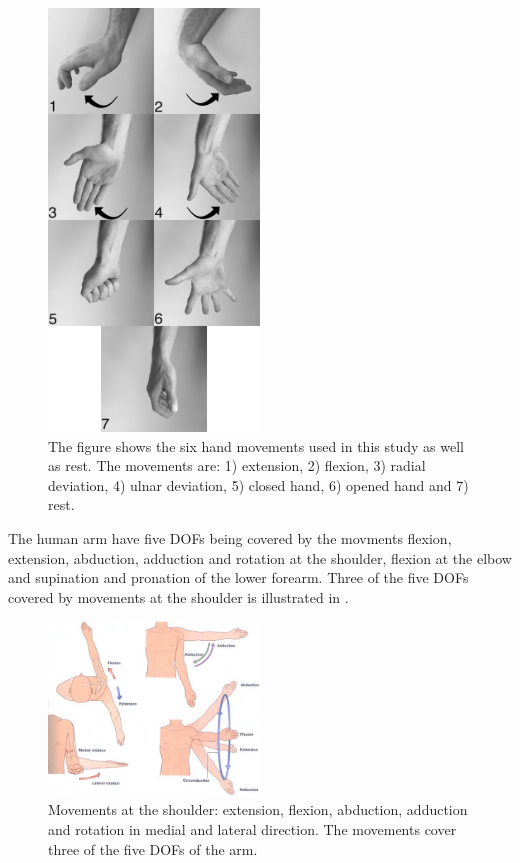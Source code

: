 \begin{figure}[H] 
	\includegraphics[width=0.5\textwidth]{figures/handGestures/BW/allHandMovementsVerticalBW}
	\caption{The figure shows the six hand movements used in this study as well as rest. The movements are: 1) extension, 2) flexion, 3) radial deviation, 4) ulnar deviation, 5) closed hand, 6) opened hand and 7) rest.}
	\label{fig:handMovements}
\end{figure}

The human arm have five DOFs being covered by the movments flexion, extension, abduction, adduction and rotation at the shoulder, flexion at the elbow and supination and pronation of the lower forearm. Three of the five DOFs covered by movements at the shoulder is illustrated in .

\begin{figure}[H] 
	\includegraphics[width=0.5\textwidth]{figures/xBackground/aAnatomy/armMovements}
	\caption{Movements at the shoulder: extension, flexion, abduction, adduction and rotation in medial and lateral direction. The movements cover three of the five DOFs of the arm. \cite{armMovements}}
	\label{fig:armMovements}
\end{figure}

